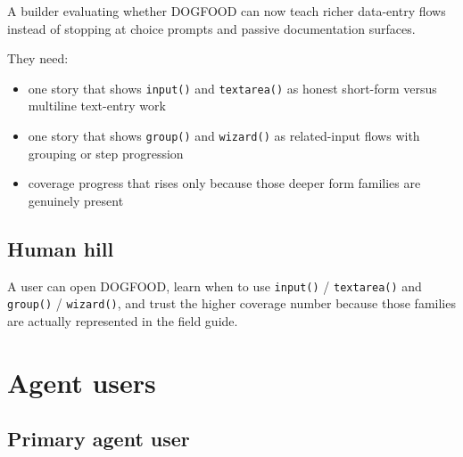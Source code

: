 A builder evaluating whether DOGFOOD can now teach richer data-entry flows instead of stopping at choice prompts and passive documentation surfaces.

They need:

\begin{itemize}
\tightlist
\item
  one story that shows \texttt{i\allowbreak{}n\allowbreak{}p\allowbreak{}u\allowbreak{}t\allowbreak{}(\allowbreak{})} and \texttt{t\allowbreak{}e\allowbreak{}x\allowbreak{}t\allowbreak{}a\allowbreak{}r\allowbreak{}e\allowbreak{}a\allowbreak{}(\allowbreak{})} as honest short-form versus multiline text-entry work
\item
  one story that shows \texttt{g\allowbreak{}r\allowbreak{}o\allowbreak{}u\allowbreak{}p\allowbreak{}(\allowbreak{})} and \texttt{w\allowbreak{}i\allowbreak{}z\allowbreak{}a\allowbreak{}r\allowbreak{}d\allowbreak{}(\allowbreak{})} as related-input flows with grouping or step progression
\item
  coverage progress that rises only because those deeper form families are genuinely present
\end{itemize}

\subsection{Human hill}\label{record-073-human-hill}

A user can open DOGFOOD, learn when to use \texttt{i\allowbreak{}n\allowbreak{}p\allowbreak{}u\allowbreak{}t\allowbreak{}(\allowbreak{})} / \texttt{t\allowbreak{}e\allowbreak{}x\allowbreak{}t\allowbreak{}a\allowbreak{}r\allowbreak{}e\allowbreak{}a\allowbreak{}(\allowbreak{})} and \texttt{g\allowbreak{}r\allowbreak{}o\allowbreak{}u\allowbreak{}p\allowbreak{}(\allowbreak{})} / \texttt{w\allowbreak{}i\allowbreak{}z\allowbreak{}a\allowbreak{}r\allowbreak{}d\allowbreak{}(\allowbreak{})}, and trust the higher coverage number because those families are actually represented in the field guide.

\section{Agent users}\label{record-073-agent-users}

\subsection{Primary agent user}\label{record-073-primary-agent-user}

